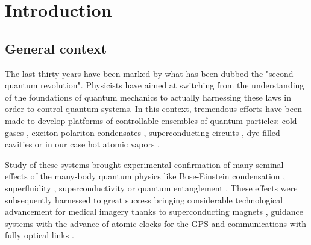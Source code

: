 
\chapter*{Introduction}

{}

\section*{General context}

The last thirty years have been marked by what has been dubbed the "second quantum 
revolution".
Physicists have aimed at switching from the understanding of the foundations of quantum
mechanics to actually harnessing these laws in order to control quantum systems.
In this context, tremendous efforts have been made to develop platforms of controllable
ensembles of quantum particles: cold gases 
\cite{dalibard_fluides_cdf_2016,dalibard_12_superfluidity,pitaevskij_bose-einstein_2016}, 
exciton polariton condensates \cite{amo_polariton_2011,Amo_fluidlightexp_2009, kasprzak_boseeinstein_2006}, 
superconducting circuits \cite{Wendin_2017}, 
dye-filled cavities \cite{Kurtscheid2019-vw, Ozturk2022-hp, Nyman2021-pd}
or in our case hot atomic vapors 
\cite{glorieuxHotAtomicVapors2023}.

Study of these systems brought experimental confirmation of many seminal effects of the 
many-body quantum physics like Bose-Einstein condensation 
\cite{bec_jila_1995, Ozturk2022-hp, kasprzak_boseeinstein_2006}, 
superfluidity \cite{dalibard_12_superfluidity}, 
superconductivity \cite{strinati_bcsbec_2018} or 
quantum entanglement \cite{josse_entanglement_2004}.
These effects were subsequently harnessed to great success bringing considerable 
technological advancement for medical imagery thanks to superconducting magnets \cite{mri_magnets},
guidance systems with the advance of atomic clocks \cite{optical_clocks} for the GPS and 
communications with fully optical links \cite{fiber_amplifiers}.

